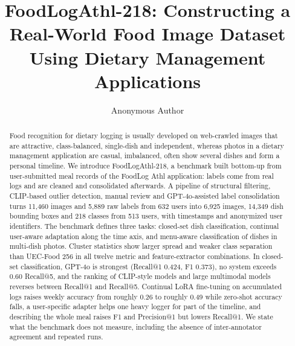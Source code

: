 \documentclass[sigconf, nonacm]{acmart}
\begin{document}
\title{FoodLogAthl-218: Constructing a Real-World Food Image Dataset\\ Using Dietary Management Applications}


\author{Anonymous Author}

\begin{abstract}
Food recognition for dietary logging is usually developed on web-crawled images that are attractive, class-balanced, single-dish and independent, whereas photos in a dietary management application are casual, imbalanced, often show several dishes and form a personal timeline. We introduce FoodLogAthl-218, a benchmark built bottom-up from user-submitted meal records of the FoodLog Athl application: labels come from real logs and are cleaned and consolidated afterwards. A pipeline of structural filtering, CLIP-based outlier detection, manual review and GPT-4o-assisted label consolidation turns 11,460 images and 5,889 raw labels from 632 users into 6,925 images, 14,349 dish bounding boxes and 218 classes from 513 users, with timestamps and anonymized user identifiers. The benchmark defines three tasks: closed-set dish classification, continual user-aware adaptation along the time axis, and menu-aware classification of dishes in multi-dish photos. Cluster statistics show larger spread and weaker class separation than UEC-Food 256 in all twelve metric and feature-extractor combinations. In closed-set classification, GPT-4o is strongest (Recall@1 0.424, F1 0.373), no system exceeds 0.60 Recall@5, and the ranking of CLIP-style models and large multimodal models reverses between Recall@1 and Recall@5. Continual LoRA fine-tuning on accumulated logs raises weekly accuracy from roughly 0.26 to roughly 0.49 while zero-shot accuracy falls, a user-specific adapter helps one heavy logger for part of the timeline, and describing the whole meal raises F1 and Precision@1 but lowers Recall@1. We state what the benchmark does not measure, including the absence of inter-annotator agreement and repeated runs.
\end{abstract}

\maketitle
\end{document}
